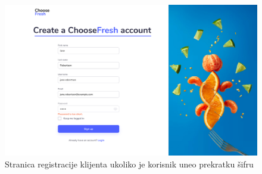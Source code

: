 \begin{figure}[H]
	\begin{center}
		\includegraphics[width=\textwidth]{UI/ShortPasswordSignUp.jpg}
    		\caption{Stranica registracije klijenta ukoliko je korisnik uneo prekratku šifru}
    \label{fig:ShortPassword}
    \end{center}
\end{figure}
